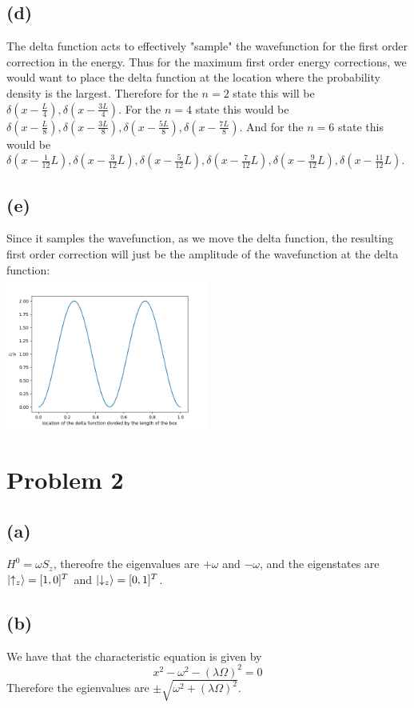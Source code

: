 \documentclass[11pt]{article}
\begin{document}
\subsection*{(d)}
The delta function acts to effectively "sample" the wavefunction for the 
first order correction in the energy. Thus for the maximum first order 
energy corrections, we would want to place the delta function 
at the location where the probability density is the largest. Therefore for the 
$n=2$ state this will be $\delta(x-\frac{L}{4}),
\delta(x-\frac{3L}{4})$. For the $n=4$ state this would be 
$\delta(x-\frac{L}{8}),\delta(x-\frac{3L}{8}),\delta(x-\frac{5L}{8}),
\delta(x-\frac{7L}{8})$. And for 
the $n=6$ state this would be
$\delta(x-\frac{1}{12}L),\delta(x-\frac{3}{12}L),\delta(x-\frac{5}{12}L),
\delta(x-\frac{7}{12}L),\delta(x-\frac{9}{12}L),\delta(x-\frac{11}{12}L)$.
\subsection*{(e)}
Since it samples the wavefunction, as we move the delta function, the resulting 
first order correction will just be the amplitude of the wavefunction at the
delta function:\\
\includegraphics*[width=0.5\textwidth]{fig1.png}
\section*{Problem 2}
\subsection*{(a)}
$H^0=\omega S_z$, thereofre the eigenvalues are $+\omega$ and $-\omega$, and the 
eigenstates are $\ket{\uparrow_z}=[1,0]^T$ and $\ket{\downarrow_z}=[0,1]^T$.
\subsection*{(b)}
We have that the characteristic equation is given by
$$x^2-\omega^2-(\lambda\Omega)^2=0$$
Therefore the egienvalues are $\pm\sqrt{\omega^2+(\lambda\Omega)^2}$.
\end{document}
